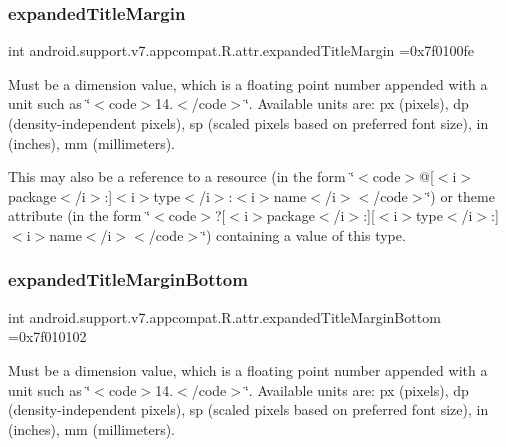 \subsubsection{\texorpdfstring{expanded\+Title\+Margin}{expandedTitleMargin}}
{\footnotesize\ttfamily int android.\+support.\+v7.\+appcompat.\+R.\+attr.\+expanded\+Title\+Margin =0x7f0100fe\hspace{0.3cm}{\ttfamily [static]}}

Must be a dimension value, which is a floating point number appended with a unit such as \char`\"{}$<$code$>$14.\+5sp$<$/code$>$\char`\"{}. Available units are\+: px (pixels), dp (density-\/independent pixels), sp (scaled pixels based on preferred font size), in (inches), mm (millimeters). 

This may also be a reference to a resource (in the form \char`\"{}$<$code$>$@\mbox{[}$<$i$>$package$<$/i$>$\+:\mbox{]}$<$i$>$type$<$/i$>$\+:$<$i$>$name$<$/i$>$$<$/code$>$\char`\"{}) or theme attribute (in the form \char`\"{}$<$code$>$?\mbox{[}$<$i$>$package$<$/i$>$\+:\mbox{]}\mbox{[}$<$i$>$type$<$/i$>$\+:\mbox{]}$<$i$>$name$<$/i$>$$<$/code$>$\char`\"{}) containing a value of this type. \mbox{\label{classandroid_1_1support_1_1v7_1_1appcompat_1_1R_1_1attr_a27c921b6ba56656c0f68d92fd8d73095}} 
\subsubsection{\texorpdfstring{expanded\+Title\+Margin\+Bottom}{expandedTitleMarginBottom}}
{\footnotesize\ttfamily int android.\+support.\+v7.\+appcompat.\+R.\+attr.\+expanded\+Title\+Margin\+Bottom =0x7f010102\hspace{0.3cm}{\ttfamily [static]}}

Must be a dimension value, which is a floating point number appended with a unit such as \char`\"{}$<$code$>$14.\+5sp$<$/code$>$\char`\"{}. Available units are\+: px (pixels), dp (density-\/independent pixels), sp (scaled pixels based on preferred font size), in (inches), mm (millimeters). 

